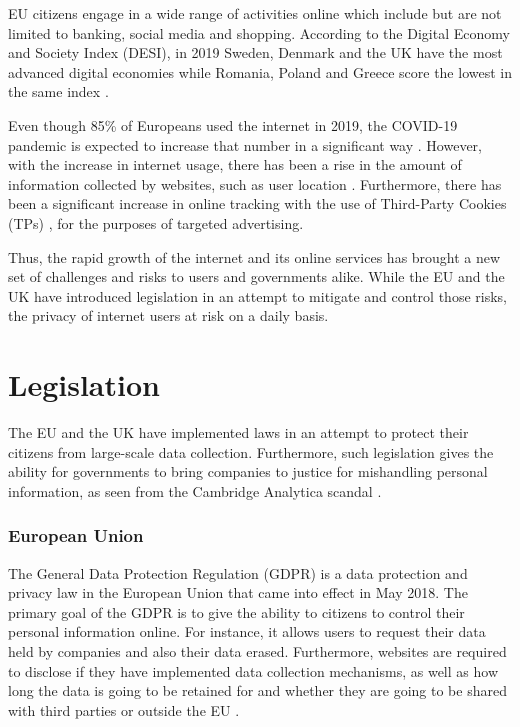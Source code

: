 \documentclass[../main.tex]{subfiles}
\begin{document}
EU citizens engage in a wide range of activities online which include but are not limited to banking, social media and shopping. According to the Digital Economy and Society Index (DESI), in 2019 Sweden, Denmark and the UK have the most advanced digital economies while Romania, Poland and Greece score the lowest in the same index \cite{desi_2019}.

Even though 85\% of Europeans used the internet in 2019, the COVID-19 pandemic is expected to increase that number in a significant way \cite{desi_2020}. However, with the increase in internet usage, there has been a rise in the amount of information collected by websites, such as user location \cite{hern_2018}. Furthermore, there has been a significant increase in online tracking with the use of Third-Party Cookies (TPs) \cite{roesner_2012}, for the purposes of targeted advertising. 

Thus, the rapid growth of the internet and its online services has brought a new set of challenges and risks to users and governments alike. While the EU and the UK have introduced legislation in an attempt to mitigate and control those risks, the privacy of internet users at risk on a daily basis. 

\section{Legislation}
The EU and the UK have implemented laws in an attempt to protect their citizens from large-scale data collection. Furthermore, such legislation gives the ability for governments to bring companies to justice for mishandling personal information, as seen from the Cambridge Analytica scandal \cite{guardian_analytica}.

\subsubsection{European Union}
The General Data Protection Regulation (GDPR) is a data protection and privacy law in the European Union that came into effect in May 2018. The primary goal of the GDPR is to give the ability to citizens to control their personal information online. For instance, it allows users to request their data held by companies and also their data erased. Furthermore, websites are required to disclose if they have implemented data collection mechanisms, as well as how long the data is going to be retained for and whether they are going to be shared with third parties or outside the EU \cite{gdpr_legal_text}.
\end{document}

